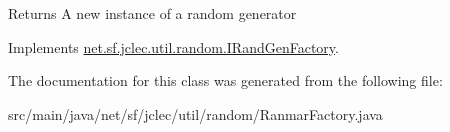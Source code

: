 \begin{DoxyReturn}{Returns}
A new instance of a random generator
\end{DoxyReturn}
 

Implements \hyperlink{interfacenet_1_1sf_1_1jclec_1_1util_1_1random_1_1_i_rand_gen_factory_a03320bb7d2eae4643d02ec66b08db1aa}{net.\-sf.\-jclec.\-util.\-random.\-I\-Rand\-Gen\-Factory}.



The documentation for this class was generated from the following file\-:\begin{DoxyCompactItemize}
\item 
src/main/java/net/sf/jclec/util/random/Ranmar\-Factory.\-java\end{DoxyCompactItemize}
